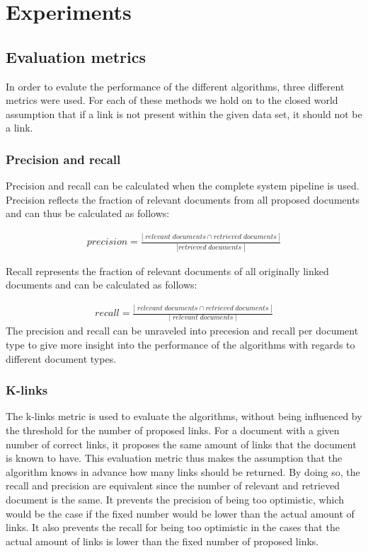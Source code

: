 \section{Experiments}
\subsection{Evaluation metrics}
In order to evalute the performance of the different algorithms, three different metrics were used. For each of these methods we hold on to the closed world assumption that if a link is not present within the given data set, it should not be a link. 

\subsubsection{Precision and recall}
Precision and recall can be calculated when the complete system pipeline is used. Precision reflects the fraction of relevant documents from all proposed documents and can thus be calculated as follows:

\begin{align}
\nonumber precision = \frac{|\;relevant\;documents \cap retrieved\;documents\;|}{|retrieved\;documents\;|}
\end{align}

Recall represents the fraction of relevant documents of all originally linked documents and can be calculated as follows:

\begin{align}
\nonumber recall = \frac{|\;relevant\;documents \cap retrieved\;documents\;|}{|\;relevant\;documents\;|}
\end{align}
The precision and recall can be unraveled into precesion and recall per document type to give more insight into the performance of the algorithms with regards to different document types. 

\subsubsection{K-links}
The k-links metric is used to evaluate the algorithms, without being influenced by the threshold for the number of proposed links. For a document with a given number of correct links, it proposes the same amount of links that the document is known to have. This evaluation metric thus makes the assumption that the algorithm knows in advance how many links should be returned. By doing so, the recall and precision are equivalent since the number of relevant and retrieved document is the same. It prevents the precision of being too optimistic, which would be the case if the fixed number would be lower than the actual amount of links. It also prevents the recall for being too optimistic in the cases that the actual amount of links is lower than the fixed number of proposed links. 


